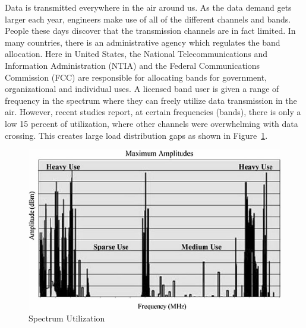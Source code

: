 
Data is transmitted everywhere in the air around us. As the data demand gets larger each year, engineers make use of all of the different 
channels and bands. People these days discover that the transmission channels are in fact limited. In many countries, there is an administrative
agency which regulates the band allocation. Here in United States, the National Telecommunications and Information Administration 
(NTIA) and the Federal Communications Commission (FCC) are responsible for allocating bands for government, organizational and
individual uses. A licensed band user is given a range of frequency in the spectrum where they can freely utilize data transmission
in the air. However, recent studies report, at certain frequencies (bands), there is only a low 15 percent of utilization, where other
channels were overwhelming with data crossing. This creates large load distribution gaps as shown in Figure~\ref{fig:spectrum_utilization}.

\begin{figure}[ht]
\centering
\includegraphics[width=12cm]{figures/spectrum_utilization.png}
\caption{Spectrum Utilization \cite{improved_local}}
\label{fig:spectrum_utilization}
\end{figure}

